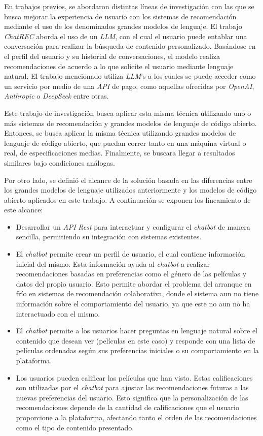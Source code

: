 \documentclass[11pt,a4paper,twoside]{thesis}
\begin{document}
En trabajos previos, se abordaron distintas líneas de investigación con las que se busca mejorar la experiencia de usuario con los sistemas de recomendación mediante el uso de los denominados grandes modelos de lenguaje. El trabajo \textit{ChatREC} \cite{chatrec} aborda el uso de un \textit{LLM}, con el cual el usuario puede entablar una conversación para realizar la búsqueda de contenido personalizado. Basándose en el perfil del usuario y su historial de conversaciones, el modelo realiza recomendaciones de acuerdo a lo que solicite el usuario mediante lenguaje natural. El trabajo mencionado \cite{chatrec} utiliza \textit{LLM}'s a los cuales se puede acceder como un servicio por medio de una \textit{API} de pago, como aquellas ofrecidas por \textit{OpenAI}, \textit{Anthropic} o \textit{DeepSeek} entre otras.

Este trabajo de investigación busca aplicar esta misma técnica utilizando uno o más sistemas de recomendación y grandes modelos de lenguaje de código abierto. Entonces, se busca aplicar la misma técnica utilizando grandes modelos de lenguaje de código abierto, que puedan correr tanto en una máquina virtual o real, de especificaciones medias. Finalmente, se buscara llegar a resultados similares bajo condiciones análogas.

Por otro lado, se definió el alcance de la solución basada en las diferencias entre los grandes modelos de lenguaje utilizados anteriormente \cite{chatrec} y los modelos de código abierto aplicados en este trabajo. A continuación se exponen los lineamiento de este alcance:

\begin{itemize}
	\setlength{\itemsep}{3pt}

	\item Desarrollar un \textit{API} \textit{Rest} para interactuar y configurar el \textit{chatbot} de manera sencilla, permitiendo su integración con sistemas existentes.
	\item El \textit{chatbot} permite crear un perfil de usuario, el cual contiene información inicial del mismo. Esta información ayuda al \textit{chatbot} a realizar recomendaciones basadas en preferencias como el género de las películas y datos del propio usuario. Esto permite abordar el problema del arranque en frío en sistemas de recomendación colaborativa, donde el sistema aun no tiene información sobre el comportamiento del usuario, ya que este no aun no ha interactuado con el mismo.
	\item El \textit{chatbot} permite a los usuarios hacer preguntas en lenguaje natural sobre el contenido que desean ver (películas en este caso) y responde con una lista de películas ordenadas según sus preferencias iniciales o su comportamiento en la plataforma.
	\item Los usuarios pueden calificar las películas que han visto. Estas calificaciones son utilizadas por el \textit{chatbot} para ajustar las recomendaciones futuras a las nuevas preferencias del usuario. Esto significa que la personalización de las recomendaciones depende de la cantidad de calificaciones que el usuario proporcione a la plataforma, afectando tanto el orden de las recomendaciones como el tipo de contenido presentado.
\end{itemize}
\end{document}
